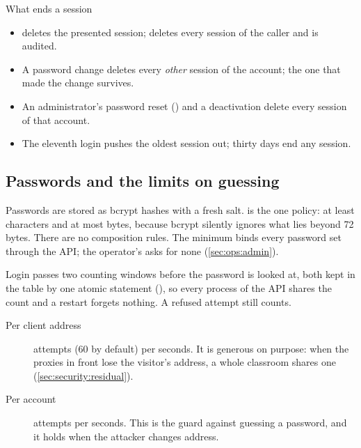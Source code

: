 \begin{codebox}{What ends a session}
\begin{itemize}
  \item {} deletes the presented session;
     deletes every session of the caller and is audited.
  \item A password change deletes every \emph{other} session of the account; the one that
    made the change survives.
  \item An administrator's password reset () and
    a deactivation delete every session of that account.
  \item The eleventh login pushes the oldest session out; thirty days end any session.
\end{itemize}
\end{codebox}

\subsection{Passwords and the limits on guessing}

Passwords are stored as bcrypt hashes with a fresh salt.  is the
one policy: at least  \code{=}  characters and at most
 \code{=}  bytes, because bcrypt silently ignores what lies beyond 72
bytes. There are no composition rules. The minimum binds every password set through the API;
the operator's  asks for none (\cref{sec:ops:admin}).

Login passes two counting windows before the password is looked at, both kept in the table
 by one atomic statement (), so every
process of the API shares the count and a restart forgets nothing. A refused attempt still
counts.

\begin{description}
  \item[Per client address]  attempts (60 by default) per
     \code{=}  seconds. It is generous on purpose: when the proxies in front
    lose the visitor's address, a whole classroom shares one (\cref{sec:security:residual}).
  \item[Per account]  \code{=}  attempts per  \code{=} 
    seconds. This is the guard against guessing a password, and it holds when the attacker
    changes address.
\end{description}

